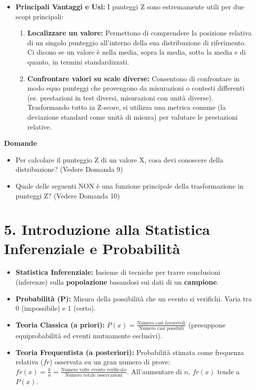 \documentclass[12pt, a4paper]{article}
\newenvironment{reflectionbox}{%
    \medskip %
    \begin{framed}\par\noindent
    \textbf{\color{boxtitlecolor}Domande} \par
    \begin{itemize}[leftmargin=*, label=$\blacktriangleright$]
}{%
    \end{itemize}\par
    \end{framed}
    \medskip %
}
\begin{document}
\begin{itemize}
    \item \textbf{Principali Vantaggi e Usi:} I punteggi Z sono estremamente utili per due scopi principali:
        \begin{enumerate}
            \item \textbf{Localizzare un valore:} Permettono di comprendere la posizione relativa di un singolo punteggio all'interno della sua distribuzione di riferimento. Ci dicono se un valore è nella media, sopra la media, sotto la media e di quanto, in termini standardizzati.
            \item \textbf{Confrontare valori su scale diverse:} Consentono di confrontare in modo equo punteggi che provengono da misurazioni o contesti differenti (es. prestazioni in test diversi, misurazioni con unità diverse). Trasformando tutto in Z-score, si utilizza una metrica comune (la deviazione standard come unità di misura) per valutare le prestazioni relative.
        \end{enumerate}
\end{itemize}

\begin{reflectionbox}
    \item Per calcolare il punteggio Z di un valore X, cosa devi conoscere della distribuzione? (Vedere Domanda 9)
    \item Quale delle seguenti NON è una funzione principale della trasformazione in punteggi Z? (Vedere Domanda 10)
\end{reflectionbox}

\section*{5. Introduzione alla Statistica Inferenziale e Probabilità}
\begin{itemize}
    \item \textbf{Statistica Inferenziale:} Insieme di tecniche per trarre conclusioni (inferenze) sulla \textbf{popolazione} basandosi sui dati di un \textbf{campione}.
    \item \textbf{Probabilità (P):} Misura della possibilità che un evento si verifichi. Varia tra 0 (impossibile) e 1 (certo).
    \item \textbf{Teoria Classica (a priori):} $P(x) = \frac{\text{Numero casi favorevoli}}{\text{Numero casi possibili}}$ (presuppone equiprobabilità ed eventi mutuamente esclusivi).
    \item \textbf{Teoria Frequentista (a posteriori):} Probabilità stimata come frequenza relativa ($fr$) osservata su un gran numero di prove: $fr(x) = \frac{k}{n} = \frac{\text{Numero volte evento verificato}}{\text{Numero totale osservazioni}}$. All'aumentare di $n$, $fr(x)$ tende a $P(x)$.
\end{itemize}
\end{document}
